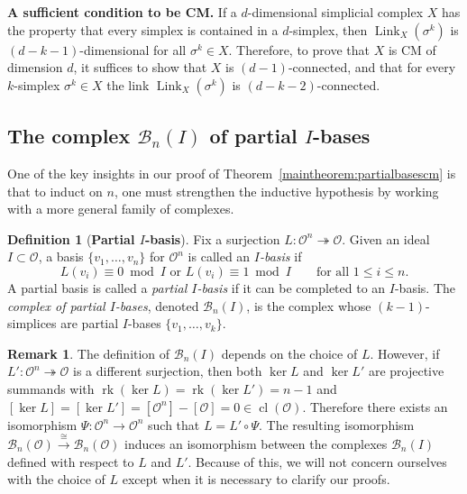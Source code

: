 \documentclass[11 pt]{article}
\theoremstyle{plain}
\theoremstyle{definition}
\newtheorem{remark}[theorem]{Remark}
\newtheorem{definition}[theorem]{Definition}
\numberwithin{equation}{section}
\newcommand{\para}[1]{\bigskip\noindent\textbf{#1.}}
\renewcommand{\O}{\mathcal{O}}
\newcommand\PartialBases{\ensuremath{\mathcal{B}}}
\newcommand{\PB}{\PartialBases}
\DeclareMathOperator{\class}{cl}
\newcommand{\cl}{\class}
\DeclareMathOperator{\Link}{Link}
\newcommand\onto{\twoheadrightarrow}
\DeclareMathOperator{\Rank}{rk}
\newcommand\iso{\cong}
\begin{document}
\para{A sufficient condition to be CM}
If a $d$-dimensional simplicial complex $X$ has the property that every simplex is contained in a $d$-simplex, then $\Link_X(\sigma^k)$ is $(d-k-1)$-dimensional for all $\sigma^k\in X$.  Therefore, to prove that $X$ is CM of dimension $d$, it suffices to show that $X$ is $(d-1)$-connected, and that for every $k$-simplex $\sigma^k\in X$ the link $\Link_X(\sigma^k)$ is $(d-k-2)$-connected. 

\subsection{The complex \texorpdfstring{$\PartialBases_n(I)$}{PBnI} of partial \texorpdfstring{$I$-bases}{I-bases}}
\label{section:partialibases}

One of the key insights in our proof of Theorem~\ref{maintheorem:partialbasescm} is
that to induct on $n$, one must strengthen the inductive hypothesis by 
working with a more general family of complexes.

\begin{definition}[{\bf Partial \boldmath$I$-basis}]
\label{def:Ibasis}
Fix a surjection $L\colon \O^n \onto \O$.  Given an ideal $I \subset \O$, a basis $\{v_1,\ldots,v_n\}$
for $\O^n$ is called  an \emph{$I$-basis} if \[L(v_i)\equiv 0\bmod{I}\text{ or }L(v_i)\equiv 1\bmod{I}\qquad \text{for all }1 \leq i \leq n.\]
A  partial basis is called a \emph{partial $I$-basis} if it can be completed to an
$I$-basis.  The \emph{complex of partial $I$-bases}, denoted $\PartialBases_n(I)$,
is the complex whose $(k-1)$-simplices are partial $I$-bases $\{v_1,\ldots,v_k\}$.
\end{definition}

\begin{remark}
\label{remark:nonuniqueBnI}
The definition of $\PartialBases_n(I)$ depends on the choice of $L$.  However, if
$L'\colon\O^n \onto \O$ is a different surjection, then both $\ker L$ and $\ker L'$ are projective summands with $\Rank(\ker L)=\Rank(\ker L')=n-1$ and $[\ker L]=[\ker L']=[\O^n]-[\O]=0\in \cl(\O)$. Therefore there exists an isomorphism $\Psi\colon \O^n \to \O^n$
such that $L = L' \circ \Psi$. The resulting isomorphism $\PB_n(\O)\xrightarrow{\iso}\PB_n(\O)$ induces an isomorphism between the complexes
$\PartialBases_n(I)$ defined with respect to $L$ and $L'$.  Because of this, we will not concern ourselves
with the choice of $L$ except when it is necessary to clarify our proofs.
\end{remark}
\end{document}
